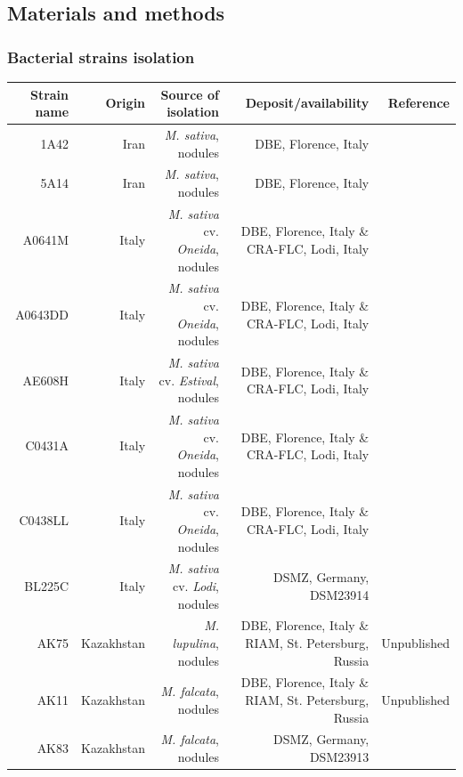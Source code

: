\begin{small}
\subsection{Materials and methods}

\subsubsection{Bacterial strains isolation}
\begin{table}
  \footnotesize
  \centering
    \begin{tabular}{rrrrr}
    \toprule
    \textbf{Strain name} & \textbf{Origin} & \textbf{Source of isolation} & \textbf{Deposit/availability} & \textbf{Reference} \\
    \midrule
    1A42  & Iran  & \textit{M. sativa}, nodules & DBE, Florence, Italy  & \cite{talebi2008diversity} \\
    5A14  & Iran  & \textit{M. sativa}, nodules & DBE, Florence, Italy  & \cite{talebi2008diversity} \\
    A0641M & Italy & \textit{M. sativa} cv. \textit{Oneida}, nodules & DBE, Florence, Italy \& CRA-FLC, Lodi, Italy & \cite{carelli2000genetic} \\
    A0643DD & Italy & \textit{M. sativa} cv. \textit{Oneida}, nodules & DBE, Florence, Italy \& CRA-FLC, Lodi, Italy & \cite{carelli2000genetic} \\
    AE608H & Italy & \textit{M. sativa} cv. \textit{Estival}, nodules & DBE, Florence, Italy \& CRA-FLC, Lodi, Italy & \cite{carelli2000genetic} \\
    C0431A & Italy & \textit{M. sativa} cv. \textit{Oneida}, nodules & DBE, Florence, Italy \& CRA-FLC, Lodi, Italy & \cite{carelli2000genetic} \\
    C0438LL & Italy & \textit{M. sativa} cv. \textit{Oneida}, nodules & DBE, Florence, Italy \& CRA-FLC, Lodi, Italy & \cite{carelli2000genetic} \\
    BL225C & Italy & \textit{M. sativa} cv. \textit{Lodi}, nodules & DSMZ, Germany, DSM23914 & \cite{giuntini2005large} \\
    AK75  & Kazakhstan & \textit{M. lupulina}, nodules & DBE, Florence, Italy \& RIAM, St. Petersburg, Russia & Unpublished \\
    AK11  & Kazakhstan & \textit{M. falcata}, nodules & DBE, Florence, Italy \& RIAM, St. Petersburg, Russia & Unpublished \\
    AK83  & Kazakhstan & \textit{M. falcata}, nodules & DSMZ, Germany, DSM23913 & \cite{giuntini2005large} \\

\end{tabular}
\end{table}
\end{small}
